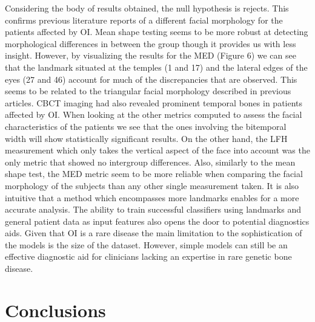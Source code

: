 \documentclass{article}
\begin{document}
\begin{multicols}{2}
Considering the body of results obtained, the null hypothesis is
rejects. This confirms previous literature reports of a different facial
morphology for the patients affected by OI. Mean shape testing seems to
be more robust at detecting morphological differences in between the
group though it provides us with less insight. However, by visualizing
the results for the MED (Figure 6) we can see that the landmark situated
at the temples (1 and 17) and the lateral edges of the eyes (27 and 46)
account for much of the discrepancies that are observed. This seems to
be related to the triangular facial morphology described in previous
articles. CBCT imaging had also revealed prominent temporal bones in
patients affected by OI. When looking at the other metrics computed to
assess the facial characteristics of the patients we see that the ones
involving the bitemporal width will show statistically significant
results. On the other hand, the LFH measurement which only takes the
vertical aspect of the face into account was the only metric that showed
no intergroup differences. Also, similarly to the mean shape test, the
MED metric seem to be more reliable when comparing the facial morphology
of the subjects than any other single measurement taken. It is also
intuitive that a method which encompasses more landmarks enables for a
more accurate analysis. The ability to train successful classifiers
using landmarks and general patient data as input features also opens
the door to potential diagnostics aids. Given that OI is a rare disease
the main limitation to the sophistication of the models is the size of
the dataset. However, simple models can still be an effective diagnostic
aid for clinicians lacking an expertise in rare genetic bone disease.

% 
% 

\section{Conclusions}


\end{multicols}
\end{document}
